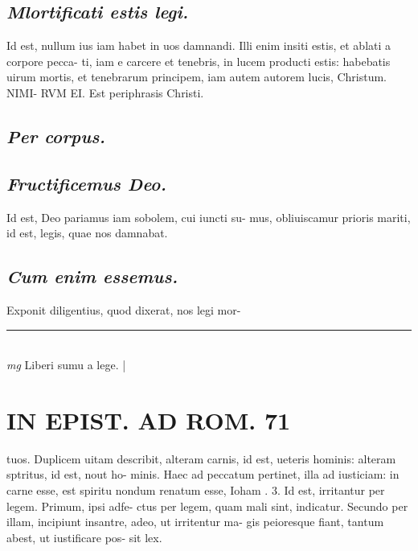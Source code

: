 \documentclass{article}
\begin{document}
\begin{pages}
\subsection*{\textit{Mlortificati estis legi. }}\pstart Id est, nullum ius iam habet in uos damnandi.   \pend\pstart Illi enim insiti estis, et ablati a corpore pecca- ti, iam e carcere et tenebris, in lucem producti estis: habebatis uirum mortis, et tenebrarum principem, iam autem autorem lucis, Christum. NIMI- RVM EI. Est periphrasis Christi.   \pend
{}
{}
\subsection*{\textit{Per corpus. }}
{}
\subsection*{\textit{Fructificemus Deo. }}\pstart Id est, Deo pariamus iam sobolem, cui iuncti su- mus, obliuiscamur prioris mariti, id est, legis, quae nos damnabat.   \pend
{}
{}
\subsection*{\textit{Cum enim essemus. }}\pstart Exponit diligentius, quod dixerat, nos legi mor-  \pend\pstart  \pend
\vspace{0.5cm}\noindent
\vspace{0.2cm}\rule{1cm}{0.2pt}\\ 
\hspace{0.2cm}\textit{mg}
\footnotesize Liberi sumu a lege. 
\normalsize| 
\section*{IN EPIST. AD ROM.  71 }
\marginpar{[ p.]}\pstart tuos. Duplicem uitam describit, alteram carnis, id est, ueteris hominis: alteram sptritus, id est, nout ho- minis. Haec ad peccatum pertinet, illa ad iusticiam: in carne esse, est spiritu nondum renatum esse, Ioham . 3.   \pend\pstart Id est, irritantur per legem. Primum, ipsi adfe- ctus per legem, quam mali sint, indicatur. Secundo per illam, incipiunt insantre, adeo, ut irritentur ma- gis peioresque fiant, tantum abest, ut iustificare pos- sit lex.   \pend
{}
{}

\end{pages}
\end{document}
